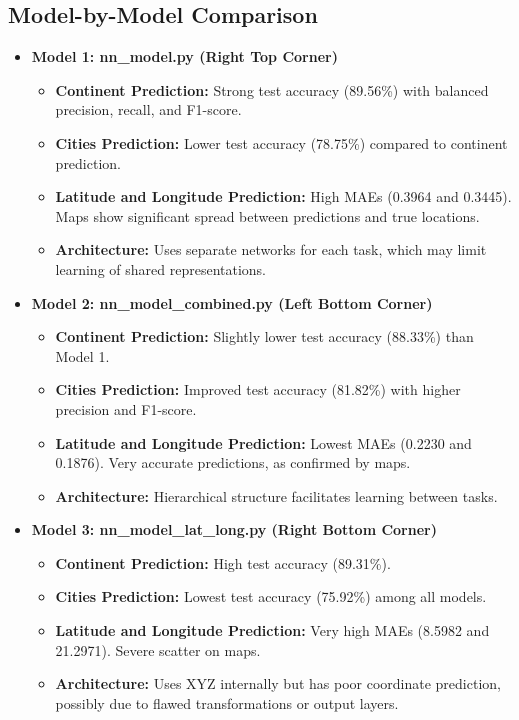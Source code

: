 \documentclass{article}
\begin{document}
\subsection*{Model-by-Model Comparison}
\begin{itemize}
    \item \textbf{Model 1: nn\_model.py (Right Top Corner)}
    \begin{itemize}
        \item \textbf{Continent Prediction:} Strong test accuracy (89.56\%) with balanced precision, recall, and F1-score.
        \item \textbf{Cities Prediction:} Lower test accuracy (78.75\%) compared to continent prediction.
        \item \textbf{Latitude and Longitude Prediction:} High MAEs (0.3964 and 0.3445). Maps show significant spread between predictions and true locations.
        \item \textbf{Architecture:} Uses separate networks for each task, which may limit learning of shared representations.
    \end{itemize}

    \item \textbf{Model 2: nn\_model\_combined.py (Left Bottom Corner)}
    \begin{itemize}
        \item \textbf{Continent Prediction:} Slightly lower test accuracy (88.33\%) than Model 1.
        \item \textbf{Cities Prediction:} Improved test accuracy (81.82\%) with higher precision and F1-score.
        \item \textbf{Latitude and Longitude Prediction:} Lowest MAEs (0.2230 and 0.1876). Very accurate predictions, as confirmed by maps.
        \item \textbf{Architecture:} Hierarchical structure facilitates learning between tasks.
    \end{itemize}

    \item \textbf{Model 3: nn\_model\_lat\_long.py (Right Bottom Corner)}
    \begin{itemize}
        \item \textbf{Continent Prediction:} High test accuracy (89.31\%).
        \item \textbf{Cities Prediction:} Lowest test accuracy (75.92\%) among all models.
        \item \textbf{Latitude and Longitude Prediction:} Very high MAEs (8.5982 and 21.2971). Severe scatter on maps.
        \item \textbf{Architecture:} Uses XYZ internally but has poor coordinate prediction, possibly due to flawed transformations or output layers.
    \end{itemize}


\end{itemize}
\end{document}
